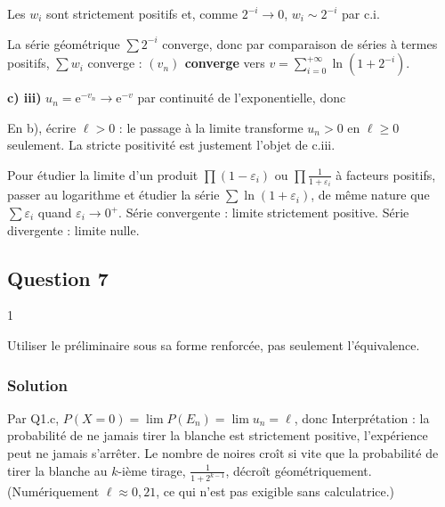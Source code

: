 \documentclass[11pt,a4paper]{article}
\newcommand{\equationajustee}[1]{%
  \sbox{\boiteequation}{$\displaystyle #1$}%
  \ifdim\wd\boiteequation>\linewidth
    \[\resizebox{\linewidth}{!}{\usebox{\boiteequation}}\]%
  \else
    \[#1\]%
  \fi}
\begin{document}
Les \(w_i\) sont strictement positifs et, comme \(2^{-i}\to0\), \(w_i\sim2^{-i}\) par c.i.

La série géométrique \(\sum2^{-i}\) converge, donc par comparaison de séries à termes positifs, \(\sum w_i\) converge : \textbf{\((v_n)\) converge} vers \(v=\sum_{i=0}^{+\infty}\ln(1+2^{-i})\).

\textbf{c) iii)} \(u_n=\mathrm e^{-v_n}\to\mathrm e^{-v}\) par continuité de l'exponentielle, donc
\equationajustee{\boxed{\ell=\mathrm e^{-v}>0}.}

\begin{piege}

En b), écrire \(\ell>0\) : le passage à la limite transforme \(u_n>0\) en \(\ell\ge0\) seulement. La stricte positivité est justement l'objet de c.iii.

\end{piege}

\begin{methode}

Pour étudier la limite d'un produit \(\prod(1-\varepsilon_i)\) ou \(\prod\frac{1}{1+\varepsilon_i}\) à facteurs positifs, passer au logarithme et étudier la série \(\sum\ln(1+\varepsilon_i)\), de même nature que \(\sum\varepsilon_i\) quand \(\varepsilon_i\to0^+\). Série convergente : limite strictement positive. Série divergente : limite nulle.

\end{methode}

\hypertarget{question-7}{%
\subsection{Question 7}\label{question-7}}

\begin{indication}{1}

Utiliser le préliminaire sous sa forme renforcée, pas seulement l'équivalence.

\end{indication}

\hypertarget{solution-6}{%
\subsubsection{Solution}\label{solution-6}}

Par Q1.c, \(P(X=0)=\lim P(E_n)=\lim u_n=\ell\), donc
\equationajustee{\boxed{P(X=0)=\ell\neq0}.}
Interprétation : la probabilité de ne jamais tirer la blanche est strictement positive, l'expérience peut ne jamais s'arrêter. Le nombre de noires croît si vite que la probabilité de tirer la blanche au \(k\)-ième tirage, \(\frac1{1+2^{k-1}}\), décroît géométriquement. (Numériquement \(\ell\approx0{,}21\), ce qui n'est pas exigible sans calculatrice.)
\end{document}
